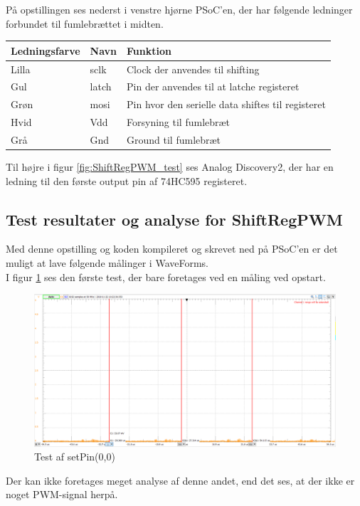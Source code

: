 \documentclass[Modultest/Modultest_main.tex]{subfiles}
\begin{document}
På opstillingen ses nederst i venstre hjørne PSoC'en, der har følgende ledninger forbundet til fumlebrættet i midten.

\begin{table}[H]
\centering
\begin{tabular}{|L{0.25\textwidth}|L{0.1\textwidth}|L{0.55\textwidth}|}
\hline
\textbf{Ledningsfarve} & \textbf{Navn} & \textbf{Funktion}                         \\ \hline
Lilla                  & sclk          & Clock der anvendes til shifting           \\ \hline
Gul                    & latch         & Pin der anvendes til at latche registeret \\ \hline
Grøn                   & mosi          & Pin hvor den serielle data shiftes til registeret \\ \hline
Hvid                   & Vdd           & Forsyning til fumlebræt                   \\ \hline
Grå                    & Gnd           & Ground til fumlebræt                      \\ \hline
\end{tabular}%

\end{table}

Til højre i figur \ref{fig:ShiftRegPWM_test} ses Analog Discovery2, der har en ledning til den første output pin af 74HC595 registeret.

\subsection{Test resultater og analyse for ShiftRegPWM} 

Med denne opstilling og koden kompileret og skrevet ned på PSoC'en er det muligt at lave følgende målinger i WaveForms.
\\I figur \ref{fig:test_0_pin_0} ses den første test, der bare foretages ved en måling ved opstart.

\begin{figure}[H]
    \centering
    \includegraphics[width=\textwidth]{Modultest/CupLight/graphics/pwm_0.png}
    \caption{Test af setPin(0,0)}
    \label{fig:test_0_pin_0}
\end{figure}
Der kan ikke foretages meget analyse af denne andet, end det ses, at der ikke er noget PWM-signal herpå.
\end{document}
